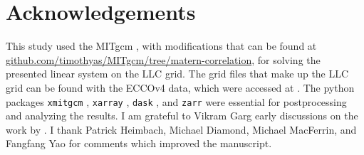 \documentclass[alpha-refs]{Wiley-LaTeX-Template/wiley-article}
\begin{document}
\linenumbers











\appendix




\section*{Acknowledgements}
This study used the MITgcm \citep{campin_mitgcmmitgcm_2021}, with modifications
that can be found at \url{github.com/timothyas/MITgcm/tree/matern-correlation}, for solving the
presented linear system on the LLC grid.
The grid files that make up the LLC grid can be found with the ECCOv4 data,
which were accessed at \citep{ecco_v4r2}.
The python packages \texttt{xmitgcm} \citep{abernathey_2021_5139886},
\texttt{xarray} \citep{hoyer2017xarray}, \texttt{dask} \citep{dask}, and
\texttt{zarr} \citep{alistair_miles_2020_3773450}
were essential for postprocessing and analyzing the results.
I am grateful to Vikram Garg early discussions on the
work by \citet{RSSB:RSSB777}.
I thank Patrick Heimbach, Michael Diamond, Michael MacFerrin, and Fangfang Yao
for comments which improved the manuscript.


\end{document}
